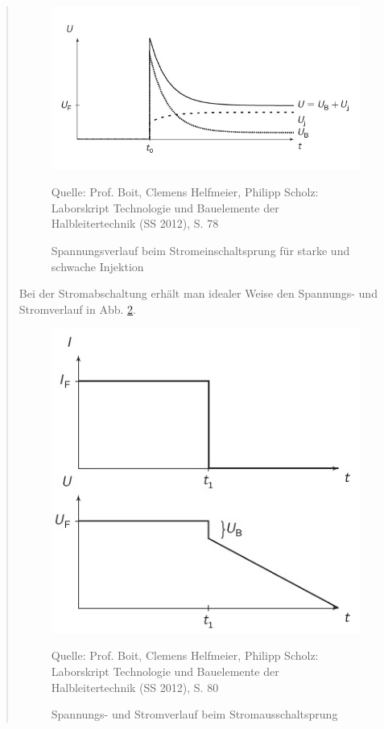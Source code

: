 \begin{quote}
    \begin{figure}[h]
        \centering
        \includegraphics[scale=1]{./SchaltverhaltenBilder/Stromeinschalten}
        \caption{Spannungsverlauf beim Stromeinschaltsprung für starke und schwache Injektion}
             \begin{center}
                 \small Quelle: Prof. Boit, Clemens Helfmeier, Philipp Scholz: Laborskript Technologie und Bauelemente der Halbleitertechnik (SS 2012), S. 78
             \end{center} 
        \label{fig:Stromeinschalten}
    \end{figure}
    
    Bei der Stromabschaltung erhält man idealer Weise den Spannungs- und 
    Stromverlauf in Abb. \ref{fig:Stromausschalten}.
    
    
    \begin{figure}[h]
        \centering
        \includegraphics[scale=1]{./SchaltverhaltenBilder/Stromausschalten.jpg}
        \caption{Spannungs- und Stromverlauf beim Stromausschaltsprung }
             \begin{center}
                 \small Quelle: Prof. Boit, Clemens Helfmeier, Philipp Scholz: Laborskript Technologie und Bauelemente der Halbleitertechnik (SS 2012), S. 80
             \end{center} 
        \label{fig:Stromausschalten}
    \end{figure} 
       

\end{quote}
